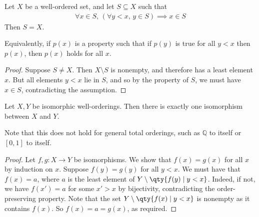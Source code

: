 \begin{proposition}
    Let $X$ be a well-ordered set, and let $S \subseteq X$ such that
    \begin{align*}
       \forall x \in S,\,(\forall y < x,\, y \in S) \implies x \in S
    \end{align*}
    Then $S = X$.
\end{proposition}

\begin{remark}
    Equivalently, if $p(x)$ is a property such that if $p(y)$ is true for all $y < x$ then $p(x)$, then $p(x)$ holds for all $x$.
\end{remark}
\begin{proof}
    Suppose $S \neq X$.
    Then $X \setminus S$ is nonempty, and therefore has a least element $x$.
    But all elements $y < x$ lie in $S$, and so by the property of $S$, we must have $x \in S$, contradicting the assumption.
\end{proof}
\begin{proposition}
    Let $X, Y$ be isomorphic well-orderings.
    Then there is exactly one isomorphism between $X$ and $Y$.
\end{proposition}
Note that this does not hold for general total orderings, such as $\mathbb Q$ to itself or $[0,1]$ to itself.
\begin{proof}
    Let $f, g \colon X \to Y$ be isomorphisms.
    We show that $f(x) = g(x)$ for all $x$ by induction on $x$.
    Suppose $f(y) = g(y)$ for all $y < x$.
    We must have that $f(x) = a$, where $a$ is the least element of $Y \setminus \qty{f(y) \mid y < x}$.
    Indeed, if not, we have $f(x') = a$ for some $x' > x$ by bijectivity, contradicting the order-preserving property.
    Note that the set $Y \setminus \qty{f(x) \mid y < x}$ is nonempty as it contains $f(x)$.
    So $f(x) = a = g(x)$, as required.
\end{proof}

